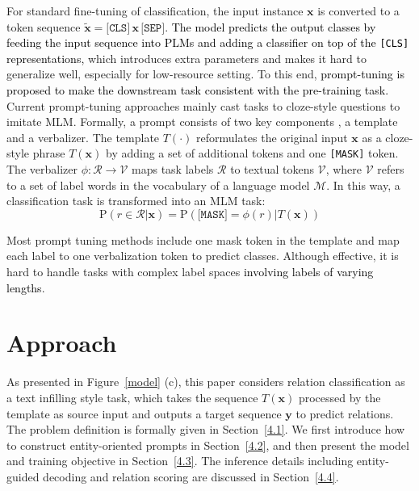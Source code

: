 \documentclass[11pt]{article}
\begin{document}
For standard fine-tuning of classification, the input instance $\boldsymbol{x}$ is converted to a token sequence $\widetilde{\boldsymbol{x}}=\texttt{[CLS]}\, \boldsymbol{x}\, \texttt{[SEP]}$. \textcolor{black}{The model predicts the output classes by feeding the input sequence into PLMs and adding a classifier on top of the \texttt{[CLS]} representations, }which introduces extra parameters and makes it hard to generalize well, especially for low-resource setting. To this end, \textcolor{black}{prompt-tuning is proposed to make the downstream task consistent with the pre-training task.} Current prompt-tuning approaches mainly cast tasks to cloze-style questions to imitate MLM.
Formally, a prompt consists of two key components \cite{schick-schutze-2021-exploiting}, a template and a verbalizer. The template $ T(\cdot)$ reformulates the original input $\boldsymbol{x}$ as a cloze-style phrase $ T(\boldsymbol{x})$  by adding a set of additional tokens and one \texttt{[MASK]} token. The verbalizer $\phi: \mathcal{R}\rightarrow\mathcal{V}$ maps task labels $\mathcal{R}$ to textual tokens $\mathcal{V}$, where $\mathcal{V}$ refers to a set of
label words in the vocabulary of a language model $\mathcal{M}$. In this way, a classification task is transformed into an MLM task:
\begin{equation*}
	\mathrm{P}(r\in\mathcal{R}|\boldsymbol{x})=\mathrm{P}(\texttt{[MASK]}=\phi(r)|T(\boldsymbol{x}))
\end{equation*}

Most prompt tuning methods include one mask token in the template and map each label to one verbalization token to predict classes. Although effective, it is hard to handle tasks with complex label spaces \textcolor{black}{involving labels of varying lengths}.

\section{Approach}\label{4}
As presented in Figure~\ref{model} (c), this paper considers relation classification as a text infilling style task, which takes the sequence $T(\boldsymbol{x})$ processed by the template as source input and outputs a target sequence $\boldsymbol{y}$ to predict relations. The problem definition is formally given in Section~\ref{4.1}. We first introduce how to construct entity-oriented prompts in Section~\ref{4.2}, and then present the model and training objective in Section~\ref{4.3}. The inference details including entity-guided decoding and relation scoring are discussed in Section~\ref{4.4}.
\end{document}
